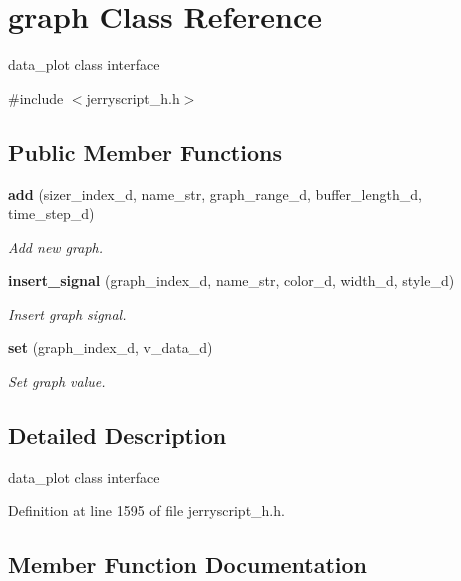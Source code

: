 \section{graph Class Reference}
\label{classgraph}


data\+\_\+plot class interface  




{\ttfamily \#include $<$jerryscript\+\_\+h.\+h$>$}

\subsection*{Public Member Functions}
\begin{DoxyCompactItemize}
\item 
\textbf{ add} (sizer\+\_\+index\+\_\+d, name\+\_\+str, graph\+\_\+range\+\_\+d, buffer\+\_\+length\+\_\+d, time\+\_\+step\+\_\+d)
\begin{DoxyCompactList}\small\item\em Add new graph. \end{DoxyCompactList}\item 
\textbf{ insert\+\_\+signal} (graph\+\_\+index\+\_\+d, name\+\_\+str, color\+\_\+d, width\+\_\+d, style\+\_\+d)
\begin{DoxyCompactList}\small\item\em Insert graph signal. \end{DoxyCompactList}\item 
\textbf{ set} (graph\+\_\+index\+\_\+d, v\+\_\+data\+\_\+d)
\begin{DoxyCompactList}\small\item\em Set graph value. \end{DoxyCompactList}\end{DoxyCompactItemize}


\subsection{Detailed Description}
data\+\_\+plot class interface 

Definition at line 1595 of file jerryscript\+\_\+h.\+h.



\subsection{Member Function Documentation}
\mbox{\label{classgraph_ab9fdeb32fa1db2047ea22c0325eed411}} 
